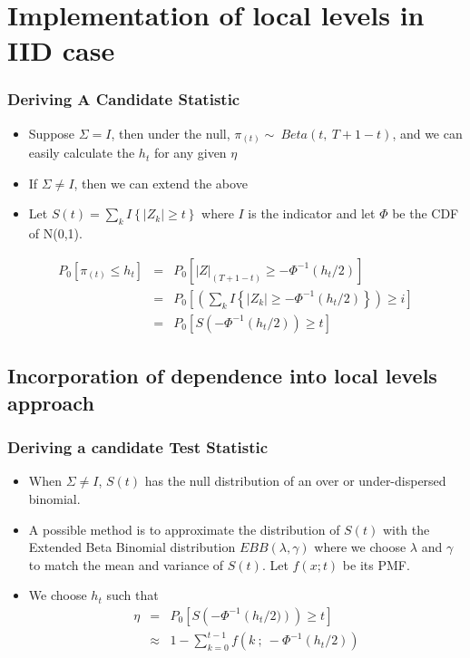 \documentclass{beamer}
\begin{document}
\section{Implementation of local levels in IID case}

\begin{frame}
\frametitle{Deriving A Candidate Statistic}
\begin{itemize}
\item Suppose $\Sigma=I$, then under the null, $\pi_{(t)}\sim\ Beta(t,\ T+1-t)$, and we can easily calculate the $h_t$ for any given $\eta$
\item If $\Sigma\neq I$, then we can extend the above
\item Let $S(t)=\sum_k I\left\{|Z_k|\ge t\right\}$ where $I$ is the indicator and let $\Phi$ be the CDF of N(0,1).   
\end{itemize}
\begin{eqnarray*}
P_0\left[\pi_{ (t) }\le h_t\right]&=&P_0\left[|Z|_{(T+1-t)}\ge -\Phi^{-1}(h_t/2)\right]\\
&=&P_0\left[\left(\sum_{ k } I\left\{|Z_k| \ge -\Phi^{-1}(h_t/2)\right\}\right) \ge i\right] \\
&=& P_0\left[S\left(-\Phi^{-1}(h_t/2)\right)\ge t\right]
\end{eqnarray*}
\end{frame}

\subsection{Incorporation of dependence into local levels approach}

\begin{frame}
\frametitle{Deriving a candidate Test Statistic}
\begin{itemize}
\item When $\Sigma\ne I$, $S(t)$ has the null distribution of an over or under-dispersed binomial.  
\item A possible method is to approximate the distribution of $S(t)$ with the Extended Beta Binomial distribution $EBB(\lambda,\gamma)$ where we choose $\lambda$ and $\gamma$ to match the mean and variance of $S(t)$.  Let $f(x;t)$ be its PMF.
\item We choose $h_t$ such that 
\begin{eqnarray*}
\eta&=&P_0\left[S\left(-\Phi^{-1}\left(h_t/2)\right)\right)\ge t\right]\\
&\approx&1-\sum_{k=0}^{t-1}f\left(k\ ;\ -\Phi^{-1}\left(h_t/2\right)\right)
\end{eqnarray*}
\end{itemize}
\end{frame}
\end{document}
